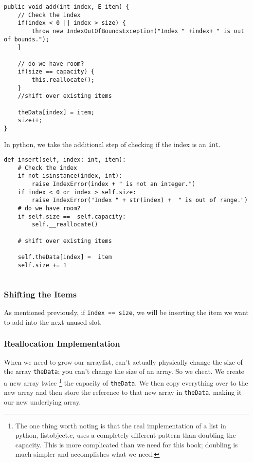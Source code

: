 \begin{verbatim}
public void add(int index, E item) {
	// Check the index
	if(index < 0 || index > size) {
		throw new IndexOutOfBoundsException("Index " +index+ " is out of bounds.");
	}
	
	// do we have room?
	if(size == capacity) { 
		this.reallocate();
	}
	//shift over existing items
	
	theData[index] = item;
	size++;
}
\end{verbatim}


In python, we take the additional step of checking if the index is an \texttt{int}.
\begin{verbatim}
def insert(self, index: int, item):
	# Check the index
	if not isinstance(index, int):
		raise IndexError(index + " is not an integer.")
	if index < 0 or index > self.size:
		raise IndexError("Index " + str(index) +  " is out of range.")
	# do we have room?
	if self.size ==  self.capacity:
		self.__reallocate()
	
	# shift over existing items
	
	self.theData[index] =  item
	self.size += 1
	
\end{verbatim}


\subsubsection{Shifting the Items}
As mentioned previously, if \texttt{index == size}, we will be inserting the item we want to add into the next unused slot.


\subsubsection{Reallocation Implementation}
\label{arraylist-reallocate}
When we need to grow our arraylist, can't actually physically change the size of the array \texttt{theData}; you can't change the size of an array.
So we cheat.
We create a new array twice \footnote{  The one thing worth noting is that the real implementation of a list in python, listobject.c, uses a completely different pattern than doubling the capacity.  This is more complicated than we need for this book; doubling is much simpler and accomplishes what we need.} the capacity of \texttt{theData}.
We then copy everything over to the new array and then store the reference to that new array in \texttt{theData}, making it our new underlying array. 





